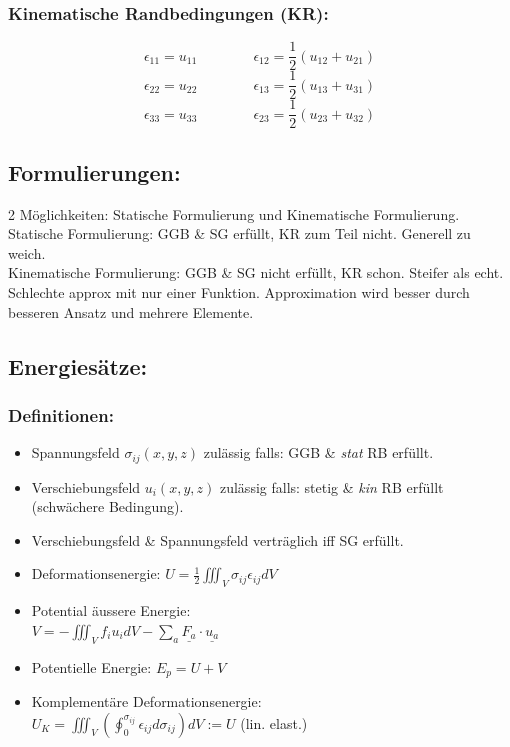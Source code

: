 \documentclass[a4paper,10pt]{article}
\begin{document}
\begin{multicols*}{3}
        \subsubsection{Kinematische Randbedingungen (KR):}
        \[\epsilon_{11} = u_{11}\quad\quad\quad\quad\epsilon_{12} = \frac{1}{2}(u_{12} + u_{21})\]
        \[\epsilon_{22} = u_{22}\quad\quad\quad\quad\epsilon_{13} = \frac{1}{2}(u_{13} + u_{31})\]
        \[\epsilon_{33} = u_{33}\quad\quad\quad\quad\epsilon_{23} = \frac{1}{2}(u_{23} + u_{32})\]
        
    \subsection{Formulierungen:}
        2 Möglichkeiten: Statische Formulierung und Kinematische Formulierung.\\
        Statische Formulierung: GGB \& SG erfüllt, KR zum Teil nicht. Generell zu weich.\\
        Kinematische Formulierung: GGB \& SG nicht erfüllt, KR schon. Steifer als echt. Schlechte approx mit nur einer Funktion. Approximation wird besser durch besseren Ansatz und mehrere Elemente.
    \subsection{Energiesätze:}
        \subsubsection{Definitionen:}
            \begin{itemize}
                \item Spannungsfeld $\sigma_{ij}(x,y,z)$ zulässig falls: GGB \& \textit{stat} RB erfüllt.
                \item Verschiebungsfeld $u_i(x,y,z)$ zulässig falls: stetig \& \textit{kin} RB erfüllt (schwächere Bedingung).
                \item Verschiebungsfeld \& Spannungsfeld verträglich iff SG erfüllt.
                \item Deformationsenergie: $\displaystyle U=\frac{1}{2}\iiint_V \sigma_{ij}\epsilon_{ij}dV$
                \item Potential äussere Energie:\\
                $\displaystyle V=-\iiint_V f_iu_idV-\sum_{a}\underline{F_a}\cdot\underline{u_a}$ 
                \item Potentielle Energie: $E_p=U+V$
                \item Komplementäre Deformationsenergie:\\ $U_K=\iiint_V(\oint_0^{\sigma_{ij}}\epsilon_{ij}d\sigma_{ij})dV := U$  (lin. elast.)
            \end{itemize}

\end{multicols*}
\end{document}
